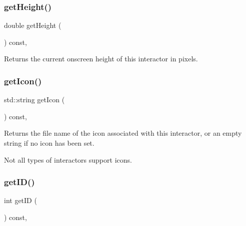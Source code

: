 \subsubsection{\texorpdfstring{get\+Height()}{getHeight()}}
{\footnotesize\ttfamily double get\+Height (\begin{DoxyParamCaption}{ }\end{DoxyParamCaption}) const\hspace{0.3cm}{\ttfamily [virtual]}, {\ttfamily [inherited]}}



Returns the current onscreen height of this interactor in pixels. 

\mbox{\label{classsgl_1_1GInteractor_aaed62a73004939a64da6f0eb9eb64d73}} 
\subsubsection{\texorpdfstring{get\+Icon()}{getIcon()}}
{\footnotesize\ttfamily std\+::string get\+Icon (\begin{DoxyParamCaption}{ }\end{DoxyParamCaption}) const\hspace{0.3cm}{\ttfamily [virtual]}, {\ttfamily [inherited]}}



Returns the file name of the icon associated with this interactor, or an empty string if no icon has been set. 

Not all types of interactors support icons. \mbox{\label{classsgl_1_1GInteractor_a9c9659a6c6ba66b4107ba59c95a24241}} 
\subsubsection{\texorpdfstring{get\+I\+D()}{getID()}}
{\footnotesize\ttfamily int get\+ID (\begin{DoxyParamCaption}{ }\end{DoxyParamCaption}) const\hspace{0.3cm}{\ttfamily [virtual]}, {\ttfamily [inherited]}}



